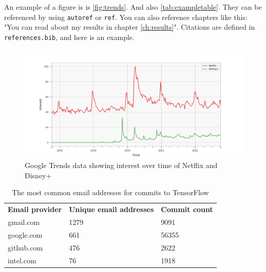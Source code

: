 
An example of a figure is is \autoref{fig:trends}. And also \autoref{tab:exampletable}. They can be referenced by using \texttt{autoref} or \texttt{ref}. You can also reference chapters like this: "You can read about my results in chapter \ref{ch:results}". Citations are defined in \texttt{references.bib}, and here is an example\cite{eghbal2020working}.

\begin{figure}
	\includegraphics[width=\linewidth]{assets/trends.pdf}
	\caption{Google Trends data showing interest over time of Netflix and Disney+}\label{fig:trends}
\end{figure}

\begin{table}[ht]
	\centering
	\begin{tabular}{lll}
		\bf{Email provider} & \bf{Unique email addresses} & \bf{Commit count} \\
		gmail.com       & 1279  & 9091  \\
		google.com      & 661   & 56355 \\
		github.com      & 476   & 2622  \\
		intel.com       & 76    & 1918  \\
	\end{tabular}
	\caption{The most common email addresses for commits to TensorFlow}\label{tab:exampletable}
\end{table}
